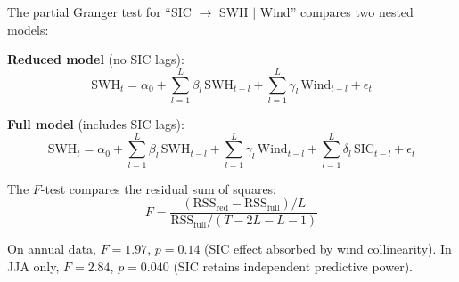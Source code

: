 \documentclass[11pt]{article}
\begin{document}
The partial Granger test for ``SIC $\to$ SWH $|$ Wind'' compares two nested models:

\noindent\textbf{Reduced model} (no SIC lags):
\[
\text{SWH}_t = \alpha_0 + \sum_{l=1}^{L} \beta_l \, \text{SWH}_{t-l} + \sum_{l=1}^{L} \gamma_l \, \text{Wind}_{t-l} + \epsilon_t
\]

\noindent\textbf{Full model} (includes SIC lags):
\[
\text{SWH}_t = \alpha_0 + \sum_{l=1}^{L} \beta_l \, \text{SWH}_{t-l} + \sum_{l=1}^{L} \gamma_l \, \text{Wind}_{t-l} + \sum_{l=1}^{L} \delta_l \, \text{SIC}_{t-l} + \epsilon_t
\]

The $F$-test compares the residual sum of squares:
\[
F = \frac{(\text{RSS}_{\text{red}} - \text{RSS}_{\text{full}}) / L}{\text{RSS}_{\text{full}} / (T - 2L - L - 1)}
\]

On annual data, $F = 1.97$, $p = 0.14$ (SIC effect absorbed by wind collinearity). In JJA only, $F = 2.84$, $p = 0.040$ (SIC retains independent predictive power).



\end{document}
